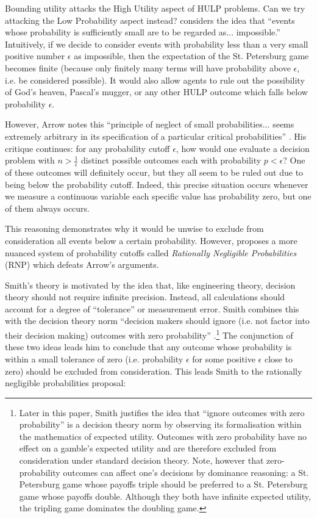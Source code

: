 \documentclass{article}
\begin{document}
Bounding utility attacks the High Utility aspect of HULP problems. Can we try attacking the Low Probability aspect instead? \citet[pg. 414]{arrow1951alternative} considers the idea that ``events whose probability is sufficiently small are to be regarded as... impossible.'' Intuitively, if we decide to consider events with probability less than a very small positive number \(\epsilon\) as impossible, then the expectation of the St. Petersburg game becomes finite (because only finitely many terms will have probability above \(\epsilon\), i.e. be considered possible). It would also allow agents to rule out the possibility of God's heaven, Pascal's mugger, or any other HULP outcome which falls below probability \(\epsilon\).

However, Arrow notes this ``principle of neglect of small probabilities... seems extremely arbitrary in its specification of a particular critical probabilities'' \citep[pg. 414]{arrow1951alternative}. His critique continues: for any probability cutoff \(\epsilon\), how would one evaluate a decision problem with \(n > \frac{1}{\epsilon}\) distinct possible outcomes each with probability \(p < \epsilon\)? One of these outcomes will definitely occur, but they all seem to be ruled out due to being below the probability cutoff. Indeed, this precise situation occurs whenever we measure a continuous variable \textemdash{} each specific value has probability zero, but one of them always occurs.

This reasoning demonstrates why it would be unwise to exclude from consideration all events below a certain probability. However, \citet{smith2014evaluative} proposes a more nuanced system of probability cutoffs called \textit{Rationally Negligible Probabilities} (RNP) which defeats Arrow's arguments.

Smith's theory is motivated by the idea that, like engineering theory, decision theory should not require infinite precision. Instead, all calculations should account for a degree of ``tolerance'' or measurement error. Smith combines this with the decision theory norm ``decision makers should ignore (i.e. not factor into their decision making) outcomes with zero probability'' \citep[pg. 472]{smith2014evaluative}.\footnote{Later in this paper, Smith justifies the idea that ``ignore outcomes with zero probability'' is a decision theory norm by observing its formalisation within the mathematics of expected utility. Outcomes with zero probability have no effect on a gamble's expected utility and are therefore excluded from consideration under standard decision theory. Note, however that zero-probability outcomes can affect one's decisions by dominance reasoning: a St. Petersburg game whose payoffs triple should be preferred to a St. Petersburg game whose payoffs double. Although they both have infinite expected utility, the tripling game dominates the doubling game.} The conjunction of these two ideas leads him to conclude that any outcome whose probability is within a small tolerance of zero (i.e. probability \(\epsilon\) for some positive \(\epsilon\) close to zero) should be excluded from consideration. This leads Smith to the rationally negligible probabilities proposal:
\end{document}
